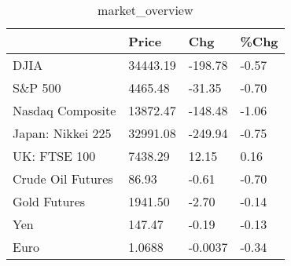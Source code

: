 \documentclass{article}%
\begin{document}
%


\begin{table}[htbp]%
\caption{market\_overview}%
\centering%
\begin{adjustbox}{width=1\textwidth}%
\begin{tabular}{llll}
\toprule
                  &    Price &     Chg &  \%Chg \\
\midrule
             DJIA & 34443.19 & -198.78 & -0.57 \\
          S\&P 500 &  4465.48 &  -31.35 & -0.70 \\
 Nasdaq Composite & 13872.47 & -148.48 & -1.06 \\
Japan: Nikkei 225 & 32991.08 & -249.94 & -0.75 \\
     UK: FTSE 100 &  7438.29 &   12.15 &  0.16 \\
Crude Oil Futures &    86.93 &   -0.61 & -0.70 \\
     Gold Futures &  1941.50 &   -2.70 & -0.14 \\
              Yen &   147.47 &   -0.19 & -0.13 \\
             Euro &   1.0688 & -0.0037 & -0.34 \\
\bottomrule
\end{tabular}
%
\end{adjustbox}%
\end{table}

%
\end{document}
